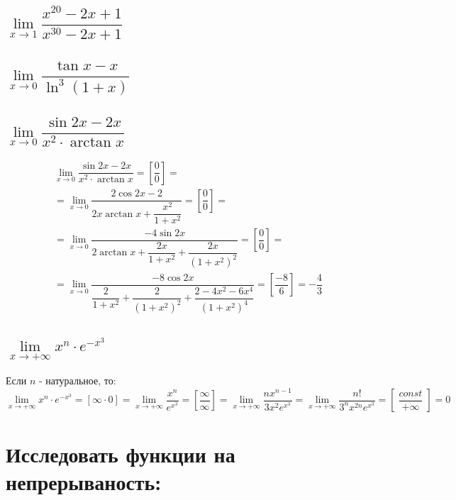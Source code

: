 \documentclass[12pt]{article}
\DeclareMathOperator{\const}{\textit{const}}
\begin{document}
\begin{sloppypar}
    \subsection{$\lim\limits_{x \rightarrow 1} \dfrac{x^{20} - 2x + 1}{x ^ {30} - 2x + 1}$}
    \subsection{$\lim\limits_{x \rightarrow 0} \dfrac{\tan x - x}{\ln^3 (1 + x)}$}
    \subsection{$\lim\limits_{x \rightarrow 0} \dfrac{\sin {2x} - 2x}{x^2 \cdot \arctan x}$}
    \begin{align*}
         & \lim_{x \rightarrow 0} \dfrac{\sin {2x} - 2x}{x^2 \cdot \arctan x} = \left[\dfrac{0}{0}\right] =                                                                            \\
         & = \lim_{x \rightarrow 0} {\dfrac{2\cos 2x - 2}{2x \arctan x + \dfrac{x^2}{1 + x^2}}} = \left[\dfrac00 \right] =                                                             \\
         & = \lim_{x \rightarrow 0} \dfrac{-4\sin 2x}{2 \arctan x + \dfrac{2x}{1 + x^2} + \dfrac{2x}{(1 + x^2)^2}} = \left[\dfrac00\right] =                                           \\
         & = \lim_{x \rightarrow 0} \dfrac{-8\cos 2x}{\dfrac{2}{1 + x^2} + \dfrac{2}{(1 + x^2)^2} + \dfrac{2 - 4x^2 - 6x^4}{(1 + x^2)^4}} = \left[\dfrac{-8}{6}\right] = -\dfrac{4}{3}
    \end{align*}
    \subsection{$\lim\limits_{x \rightarrow +\infty} {x^n \cdot e^{-x^3}}$}
    Если $n$ - натуральное, то:
    \[
        \lim_{x \rightarrow +\infty} {x^n \cdot e^{-x^3}} = \left[\infty \cdot 0 \right]
        = \lim_{x \rightarrow +\infty}{\dfrac{x^n}{e^{x ^ 3}}} = \left[\dfrac{\infty}{\infty}\right]
        = \lim_{x \rightarrow +\infty}{\dfrac{nx^{n-1}}{3x^2 e^{x^3}}}
        = \lim_{x \rightarrow +\infty}{\dfrac{n!}{3^nx^{2n}e^{x^3}}} = \left[\dfrac{\const}{+\infty}\right] = 0
    \]

    \section{Исследовать функции на непрерываность:}

\end{sloppypar}
\end{document}
